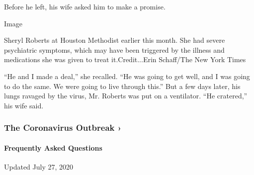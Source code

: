 Before he left, his wife asked him to make a promise.

Image

Sheryl Roberts at Houston Methodist earlier this month. She had severe
psychiatric symptoms, which may have been triggered by the illness and
medications she was given to treat it.Credit...Erin Schaff/The New York
Times

``He and I made a deal,'' she recalled. ``He was going to get well, and
I was going to do the same. We were going to live through this.'' But a
few days later, his lungs ravaged by the virus, Mr. Roberts was put on a
ventilator. ``He cratered,'' his wife said.

\href{https://www.nytimes.com/news-event/coronavirus?action=click\&pgtype=Article\&state=default\&region=MAIN_CONTENT_3\&context=storylines_faq}{}

\hypertarget{the-coronavirus-outbreak-}{%
\subsubsection{The Coronavirus Outbreak
›}\label{the-coronavirus-outbreak-}}

\hypertarget{frequently-asked-questions}{%
\paragraph{Frequently Asked
Questions}\label{frequently-asked-questions}}

Updated July 27, 2020

